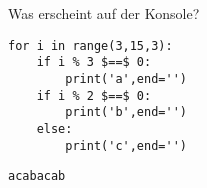 \question[4] Was erscheint auf der Konsole?
\begin{lstlisting}
for i in range(3,15,3):
    if i % 3 $==$ 0:
        print('a',end='')
    if i % 2 $==$ 0:
        print('b',end='')
    else:
        print('c',end='')
\end{lstlisting}
\begin{solutionbox}{1cm}
\texttt{acabacab}
\end{solutionbox}
